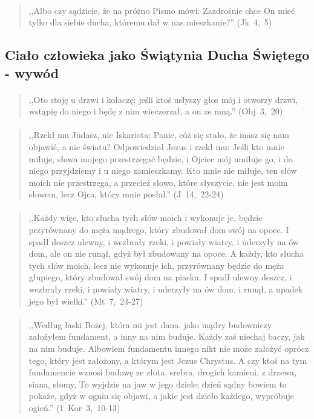 \documentclass[10pt,a4paper,oneside]{article}
\begin{document}
\paragraph{}
\begin{quote}
,,Albo czy sądzicie, że na próżno Pismo mówi: Zazdrośnie chce On mieć tylko dla siebie ducha, któremu dał w nas mieszkanie?'' \mbox{(Jk 4, 5)}
\end{quote}
\subsection{Ciało człowieka jako Świątynia Ducha Świętego - wywód}
\paragraph{}
\begin{quote}
,,Oto stoję u drzwi i kołaczę; jeśli ktoś usłyszy głos mój i otworzy drzwi, wstąpię do niego i będę z nim wieczerzał, a on ze mną.'' \mbox{(Obj 3, 20)}
\end{quote}
\paragraph{}
\begin{quote}
,,Rzekł mu Judasz, nie Iskariota: Panie, cóż się stało, że masz się nam objawić, a nie światu? Odpowiedział Jezus i rzekł mu: Jeśli kto mnie miłuje, słowa mojego przestrzegać będzie, i Ojciec mój umiłuje go, i do niego przyjdziemy i u niego zamieszkamy. Kto mnie nie miłuje, ten słów moich nie przestrzega, a przecież słowo, które słyszycie, nie jest moim słowem, lecz Ojca, który mnie posłał.'' \mbox{(J 14, 22-24)}
\end{quote}
\paragraph{}
\begin{quote}
,,Każdy więc, kto słucha tych słów moich i wykonuje je, będzie przyrównany do męża mądrego, który zbudował dom swój na opoce. I spadł deszcz ulewny, i wezbrały rzeki, i powiały wiatry, i uderzyły na ów dom, ale on nie runął, gdyż był zbudowany na opoce. A każdy, kto słucha tych słów moich, lecz nie wykonuje ich, przyrównany będzie do męża głupiego, który zbudował swój dom na piasku. I spadł ulewny deszcz, i wezbrały rzeki, i powiały wiatry, i uderzyły na ów dom, i runął, a upadek jego był wielki.'' \mbox{(Mt 7, 24-27)}
\end{quote}
\paragraph{}
\begin{quote}
,,Według łaski Bożej, która mi jest dana, jako mądry budowniczy założyłem fundament, a inny na nim buduje. Każdy zaś niechaj baczy, jak na nim buduje. Albowiem fundamentu innego nikt nie może założyć oprócz tego, który jest założony, a którym jest Jezus Chrystus. A czy ktoś na tym fundamencie wznosi budowę ze złota, srebra, drogich kamieni, z drzewa, siana, słomy, To wyjdzie na jaw w jego dziele; dzień sądny bowiem to pokaże, gdyż w ogniu się objawi, a jakie jest dzieło każdego, wypróbuje ogień.'' \mbox{(1 Kor 3, 10-13)}
\end{quote}
\end{document}
